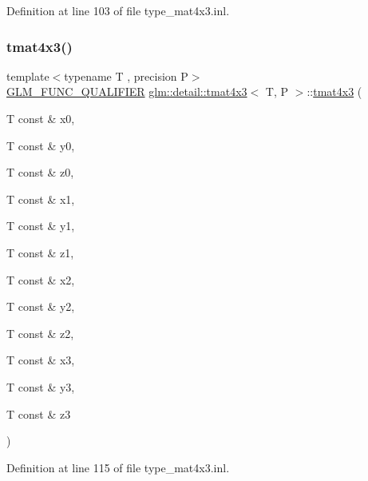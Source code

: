 Definition at line 103 of file type\+\_\+mat4x3.\+inl.

\mbox{\label{structglm_1_1detail_1_1tmat4x3_ae83188b56015ab7922dd9827a8795f65}} 
\subsubsection{\texorpdfstring{tmat4x3()}{tmat4x3()}\hspace{0.1cm}{\footnotesize\ttfamily [6/22]}}
{\footnotesize\ttfamily template$<$typename T , precision P$>$ \\
\hyperlink{setup_8hpp_a33fdea6f91c5f834105f7415e2a64407}{G\+L\+M\+\_\+\+F\+U\+N\+C\+\_\+\+Q\+U\+A\+L\+I\+F\+I\+ER} \hyperlink{structglm_1_1detail_1_1tmat4x3}{glm\+::detail\+::tmat4x3}$<$ T, P $>$\+::\hyperlink{structglm_1_1detail_1_1tmat4x3}{tmat4x3} (\begin{DoxyParamCaption}\item[{T const \&}]{x0,  }\item[{T const \&}]{y0,  }\item[{T const \&}]{z0,  }\item[{T const \&}]{x1,  }\item[{T const \&}]{y1,  }\item[{T const \&}]{z1,  }\item[{T const \&}]{x2,  }\item[{T const \&}]{y2,  }\item[{T const \&}]{z2,  }\item[{T const \&}]{x3,  }\item[{T const \&}]{y3,  }\item[{T const \&}]{z3 }\end{DoxyParamCaption})}



Definition at line 115 of file type\+\_\+mat4x3.\+inl.

\mbox{\label{structglm_1_1detail_1_1tmat4x3_a5783ce8745f4ea713c2c1cde65154aaf}} 
